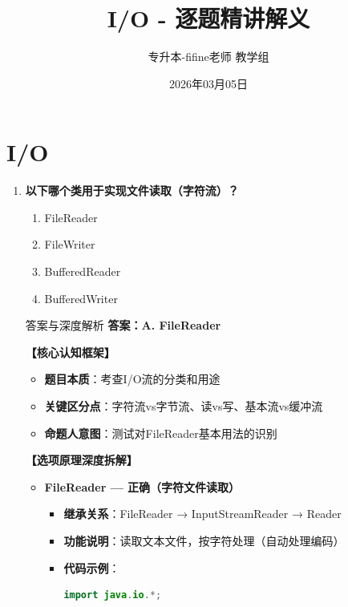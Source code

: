 \documentclass[12pt, a4paper]{ctexart}
\title{\textcolor{myblue}{\textbf{I/O - 逐题精讲解义}}}
\author{专升本-fifine老师 教学组}
\date{2026年03月05日}
\begin{document}
\maketitle
\thispagestyle{empty}
\newpage

\section{I/O}

\begin{enumerate}[label=\textbf{\arabic*.}]

	\item \textbf{以下哪个类用于实现文件读取（字符流）？}
	      \begin{enumerate}[label=\Alph*.]
		      \item FileReader
		      \item FileWriter
		      \item BufferedReader
		      \item BufferedWriter
	      \end{enumerate}

	      \begin{bluebox}{答案与深度解析}
		      \textbf{答案：A. FileReader}

		      \textbf{【核心认知框架】}
		      \begin{itemize}[label={}, leftmargin=*, nosep]
			      \item \textbf{题目本质}：考查I/O流的分类和用途
			      \item \textbf{关键区分点}：字符流vs字节流、读vs写、基本流vs缓冲流
			      \item \textbf{命题人意图}：测试对FileReader基本用法的识别
		      \end{itemize}

		      \textbf{【选项原理深度拆解】}

		      \begin{itemize}[leftmargin=*, nosep, label={}]
			      \item[A] \textbf{FileReader — 正确（字符文件读取）}
			            \begin{itemize}[label={}, leftmargin=*, nosep]
				            \item \textbf{继承关系}：FileReader → InputStreamReader → Reader
				            \item \textbf{功能说明}：读取文本文件，按字符处理（自动处理编码）
				            \item \textbf{代码示例}：
				                  \begin{lstlisting}[language=Java]
import java.io.*;


\end{lstlisting}
\end{itemize}
\end{itemize}
\end{bluebox}
\end{enumerate}
\end{document}
